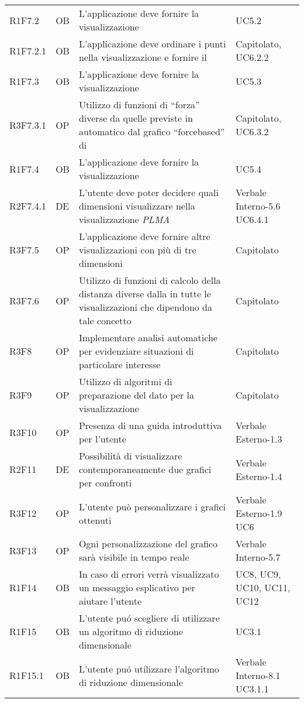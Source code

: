 {\begin{longtable}{C{2cm} | C{1.5cm} | C{9cm} | C{3.3cm}}
R1F7.2 & OB & L'applicazione deve fornire la visualizzazione  & UC5.2\\
R1F7.2.1 & OB & L'applicazione deve ordinare i punti nella visualizzazione  e fornire il  & Capitolato, UC6.2.2 \\
R1F7.3 & OB & L'applicazione deve fornire la visualizzazione  & UC5.3\\
R3F7.3.1 & OP & Utilizzo di funzioni di “forza” diverse da quelle previste in automatico dal grafico “forcebased” di  & Capitolato, UC6.3.2\\
R1F7.4 & OB & L'applicazione deve fornire la visualizzazione  & UC5.4 \\
R2F7.4.1 & DE & L'utente deve poter decidere quali dimensioni visualizzare nella visualizzazione \textit{PLMA} & Verbale Interno-5.6 \newline UC6.4.1\\
R3F7.5 & OP & L'applicazione deve fornire altre visualizzazioni con più di tre dimensioni & Capitolato\\
R3F7.6 & OP & Utilizzo di funzioni di calcolo della distanza diverse dalla  in tutte le visualizzazioni che dipendono da tale concetto & Capitolato \\
R3F8 & OP & Implementare analisi automatiche per evidenziare situazioni di particolare interesse & Capitolato\\
R3F9 & OP & Utilizzo di algoritmi di preparazione del dato per la visualizzazione & Capitolato\\
R3F10 & OP & Presenza di una guida introduttiva per l'utente & Verbale Esterno-1.3\\
R2F11 & DE & Possibilità di visualizzare contemporaneamente due grafici per confronti & Verbale Esterno-1.4\\
R3F12 & OP & L'utente può personalizzare i grafici ottenuti & Verbale Esterno-1.9 \newline UC6 \\
R3F13 & OP & Ogni personalizzazione del grafico sarà visibile in tempo reale & Verbale Interno-5.7 \\
R1F14 & OB & In caso di errori verrà visualizzato un messaggio esplicativo per aiutare l'utente & UC8, UC9, UC10, UC11, UC12\\
R1F15 & OB & L'utente puó scegliere di utilizzare un algoritmo di riduzione dimensionale & UC3.1 \\
R1F15.1 & OB & L'utente puó utilizzare l'algoritmo di riduzione dimensionale  & Verbale Interno-8.1 \newline UC3.1.1 \\

\end{longtable}}
